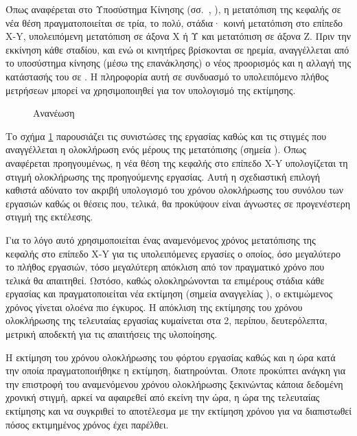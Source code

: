 Όπως αναφέρεται στο Υποσύστημα Κίνησης
(σσ.~\pageref{ssubsec:motor:routing},%
\pageref{ssubsec:motor:common-translation}),
η μετατόπιση της κεφαλής σε νέα θέση πραγματοποιείται σε τρία, το πολύ, στάδια·
κοινή μετατόπιση στο επίπεδο X-Y, υπολειπόμενη μετατόπιση σε άξονα X ή Υ και
μετατόπιση σε άξονα Z. Πριν την εκκίνηση κάθε σταδίου, και ενώ οι κινητήρες
βρίσκονται σε ηρεμία, αναγγέλλεται από το υποσύστημα κίνησης (μέσω της
επανάκλησης) ο νέος προορισμός και η αλλαγή της κατάστασής του σε . Η
πληροφορία αυτή σε συνδυασμό το υπολειπόμενο πλήθος μετρήσεων μπορεί να
χρησιμοποιηθεί για τον υπολογισμό της εκτίμησης.

\begin{figure}
    \caption{Ανανέωση 
    \label{fig:task:estimate-update}}
    \begin{center}
    \end{center}
\end{figure}

Το σχήμα \ref{fig:task:estimate-update} παρουσιάζει τις συνιστώσες της εργασίας
καθώς και τις στιγμές που αναγγέλλεται η ολοκλήρωση ενός μέρους της μετατόπισης
(σημεία ).
Όπως αναφέρεται προηγουμένως, η νέα θέση της κεφαλής στο επίπεδο X-Y
υπολογίζεται τη στιγμή ολοκλήρωσης της προηγούμενης εργασίας. Αυτή η σχεδιαστική
επιλογή καθιστά αδύνατο τον ακριβή υπολογισμό του χρόνου ολοκλήρωσης του συνόλου
των εργασιών καθώς οι θέσεις που, τελικά, θα προκύψουν είναι άγνωστες σε
προγενέστερη στιγμή της εκτέλεσης.

Για το λόγο αυτό χρησιμοποιείται ένας αναμενόμενος χρόνος μετατόπισης της
κεφαλής στο επίπεδο X-Y για τις υπολειπόμενες εργασίες ο οποίος, όσο μεγαλύτερο
το πλήθος εργασιών, τόσο μεγαλύτερη απόκλιση από τον πραγματικό χρόνο που
τελικά θα απαιτηθεί. Ωστόσο, καθώς ολοκληρώνονται τα επιμέρους στάδια κάθε
εργασίας και πραγματοποιείται νέα εκτίμηση (σημεία αναγγελίας ), ο
εκτιμώμενος χρόνος γίνεται ολοένα πιο έγκυρος. Η απόκλιση της εκτίμησης του
χρόνου ολοκλήρωσης της τελευταίας εργασίας κυμαίνεται στα 2, περίπου,
δευτερόλεπτα, μετρική αποδεκτή για τις απαιτήσεις της υλοποίησης.

Η εκτίμηση του χρόνου ολοκλήρωσης του φόρτου εργασίας καθώς και η ώρα κατά την
οποία πραγματοποιήθηκε η εκτίμηση, διατηρούνται. Όποτε προκύπτει ανάγκη για την
επιστροφή του αναμενόμενου χρόνου ολοκλήρωσης ξεκινώντας κάποια δεδομένη χρονική
στιγμή, αρκεί να αφαιρεθεί από εκείνη την ώρα, η ώρα της τελευταίας εκτίμησης
και να συγκριθεί το αποτέλεσμα με την εκτίμηση χρόνου για να διαπιστωθεί πόσος
εκτιμημένος χρόνος έχει παρέλθει.


